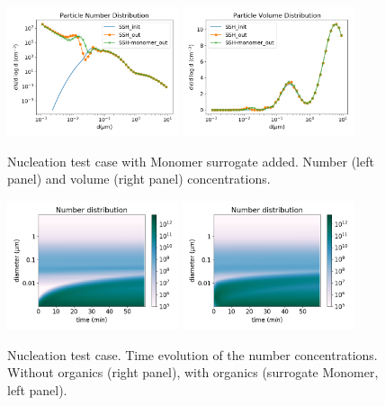 \documentclass[a4paper,11pt]{article}
\begin{document}
{{\begin{figure}[H]
        \begin{center}
                \includegraphics[angle=0,width=0.45\textwidth]{../graph/figure_ref/dNdlogd_nucl_org.png}
                \includegraphics[angle=0,width=0.45\textwidth]{../graph/figure_ref/dVdlogd_nucl_org.png}
        \end{center}
\caption{Nucleation test case with Monomer surrogate added. Number (left panel) and volume (right panel) concentrations.}
\label{fig-nucl3}
\end{figure}
       
       

\begin{figure}[H]
        \begin{center}
                \includegraphics[angle=0,width=0.45\textwidth]{../graph/figure_ref/fig_banana.png}
                \includegraphics[angle=0,width=0.45\textwidth]{../graph/figure_ref/fig_banana_org.png}
        \end{center}
\caption{Nucleation test case. Time evolution of the number concentrations. Without organics (right panel), with organics (surrogate Monomer, left panel).}
\label{fig-nucl2}
\end{figure}
       

}}
\end{document}
